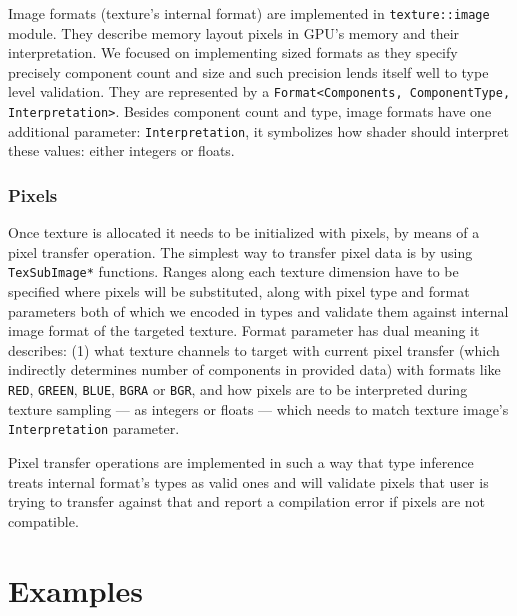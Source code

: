 Image formats (texture's internal format) are implemented in \texttt{texture::image} module.
They describe memory layout pixels in GPU's memory and their interpretation.
We focused on implementing sized formats as they specify precisely component count and size 
and such precision lends itself well to type level validation.
They are represented by a \texttt{Format<Components, ComponentType, Interpretation>}.
Besides component count and type, image formats have one additional parameter: \texttt{Interpretation},
it symbolizes how shader should interpret these values: either integers or floats.

\subsubsection{Pixels}

Once texture is allocated it needs to be initialized with pixels, by means of a pixel transfer operation.
The simplest way to transfer pixel data is by using \texttt{TexSubImage*} functions.
Ranges along each texture dimension have to be specified where pixels will be substituted,
along with pixel type and format parameters both of which we encoded in types and validate them 
against internal image format of the targeted texture.
Format parameter has dual meaning it describes: (1) what texture channels to target with current pixel transfer
(which indirectly determines number of components in provided data) with formats like \texttt{RED}, \texttt{GREEN}, \texttt{BLUE},
\texttt{BGRA} or \texttt{BGR}, and how pixels are to be interpreted during texture sampling --- as integers or floats --- which needs to match
texture image's \texttt{Interpretation} parameter.

Pixel transfer operations are implemented in such a way that type inference treats internal format's types
as valid ones and will validate pixels that user is trying to transfer against that and report a compilation error
if pixels are not compatible.

\section{Examples}

